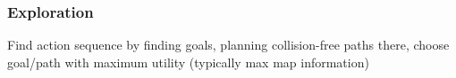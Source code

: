 \subsubsection{Exploration}
Find action sequence by finding goals, planning collision-free paths there, choose goal/path with maximum utility (typically max map information)
